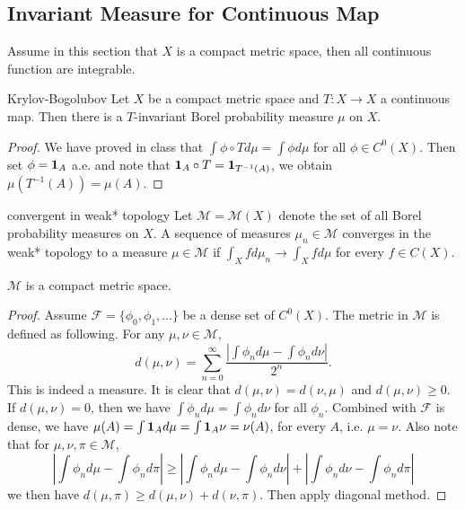 \documentclass[12pt,a4paper]{article}
\begin{document}
	\subsection{Invariant Measure for Continuous Map}
	Assume in this section that $X$ is a compact metric space, then all continuous function are integrable.
	\begin{theorem}{Krylov-Bogolubov}{}
		Let $X$ be a compact metric space and $T:X\to X$ a continuous map. Then there is a $T$-invariant Borel probability measure $\mu$ on $X$.
	\end{theorem}
	\begin{proof}
		We have proved in class that $\int \phi\circ Td\mu=\int \phi d\mu$ for all $\phi\in C^0(X)$. Then set $\phi=\mathbf{1}_A$ a.e. and note that $\mathbf{1}_A\circ T=\mathbf{1}_{T^{-1}(A)}$, we obtain $\mu(T^{-1}(A))=\mu(A)$.
	\end{proof}
	
	
	
	
	
	\newcommand{\M}{\mathcal{M}}
	
	\begin{definition}{convergent in weak* topology}{}
		Let $\M=\M(X)$ denote the set of all Borel probability measures on $X$. A sequence of measures $\mu_n\in\M$ converges in the weak* topology to a measure $\mu\in \M$ if $\int_X fd\mu_n\to \int_X f d\mu$ for every $f\in C(X)$.
	\end{definition}

	\begin{proposition}{}{}
		$\M$ is a compact metric space.
	\end{proposition}
	\begin{proof}
		Assume $\mathcal{F}=\{\phi_0,\phi_1,\dots\}$ be a dense set of $C^0(X)$. The metric in $\M$ is defined as following. For any $\mu,\nu\in \M$,
		$$
		d(\mu,\nu)=\sum_{n=0}^\infty \frac{\left|\int \phi_n d\mu-\int \phi_n d\nu\right|}{2^n}.
		$$ 
		This is indeed a measure. It is clear that $d(\mu,\nu)=d(\nu,\mu)$ and $d(\mu,\nu)\geq 0$. If $d(\mu,\nu)=0$, then we have $\int \phi_n d\mu=\int \phi_nd\nu$ for all $\phi_n$. Combined with $\mathcal{F}$ is dense, we have $\mu(A)=\int \mathbf{1}_A d\mu=\int \mathbf{1}_A \nu=\nu(A)$, for every $A$, i.e. $\mu=\nu$. Also note that for $\mu,\nu,\pi\in \M$,
		$$
		\left|\int \phi_nd\mu-\int \phi_n d\pi\right|\geq \left| \int \phi_nd\mu-\int \phi_n d\nu\right|+ 	\left|\int \phi_nd\nu-\int \phi_n d\pi\right|
		$$ 
		we then have $d(\mu,\pi)\geq d(\mu,\nu)+d(\nu,\pi)$.
		Then apply diagonal method.
	\end{proof}
	
\end{document}
